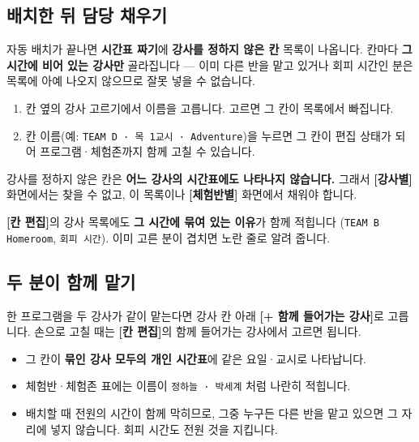 \documentclass[11pt,a4paper]{article}
\newcommand{\btn}[1]{\textcolor{ttdark}{\sffamily\bfseries[#1]}}   %
\newcommand{\tab}[1]{\textcolor{ttblue}{\sffamily\bfseries#1}}      %
\newcommand{\field}[1]{\textsf{#1}}                                 %
\newcommand{\code}[1]{\texttt{\small #1}}
\begin{document}
\subsection{배치한 뒤 담당 채우기}

자동 배치가 끝나면 \tab{시간표 짜기}에 \textbf{강사를 정하지 않은 칸} 목록이 나옵니다.
칸마다 \textbf{그 시간에 비어 있는 강사만} 골라집니다 --- 이미 다른 반을 맡고 있거나
회피 시간인 분은 목록에 아예 나오지 않으므로 잘못 넣을 수 없습니다.

\begin{enumerate}
  \item 칸 옆의 \field{강사 고르기}에서 이름을 고릅니다. 고르면 그 칸이 목록에서 빠집니다.
  \item 칸 이름(예: \code{TEAM D · 목 1교시 · Adventure})을 누르면 그 칸이 편집 상태가 되어
        프로그램·체험존까지 함께 고칠 수 있습니다.
\end{enumerate}

\begin{warn}
강사를 정하지 않은 칸은 \textbf{어느 강사의 시간표에도 나타나지 않습니다.}
그래서 \btn{강사별} 화면에서는 찾을 수 없고, 이 목록이나 \btn{체험반별} 화면에서 채워야 합니다.
\end{warn}

\begin{tip}
\btn{칸 편집}의 강사 목록에도 \textbf{그 시간에 묶여 있는 이유}가 함께 적힙니다
(\code{TEAM B Homeroom}, \code{회피 시간}). 이미 고른 분이 겹치면 노란 줄로 알려 줍니다.
\end{tip}

\subsection{두 분이 함께 맡기}

한 프로그램을 두 강사가 같이 맡는다면 강사 칸 아래 \btn{+ 함께 들어가는 강사}로 고릅니다.
손으로 고칠 때는 \btn{칸 편집}의 \field{함께 들어가는 강사}에서 고르면 됩니다.

\begin{itemize}
  \item 그 칸이 \textbf{묶인 강사 모두의 개인 시간표}에 같은 요일·교시로 나타납니다.
  \item 체험반·체험존 표에는 이름이 \code{정하늘 · 박세계} 처럼 나란히 적힙니다.
  \item 배치할 때 전원의 시간이 함께 막히므로, 그중 누구든 다른 반을 맡고 있으면 그 자리에 넣지 않습니다. 회피 시간도 전원 것을 지킵니다.
\end{itemize}
\end{document}
